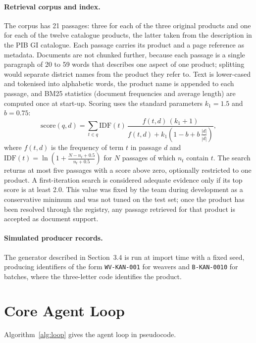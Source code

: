 \paragraph{Retrieval corpus and index.} The corpus has 21 passages: three for each of the three
original products and one for each of the twelve catalogue products, the latter taken from the
description in the PIB GI catalogue. Each passage carries its product and a page reference as metadata.
Documents are not chunked further, because each passage is a single paragraph of 20 to 59 words that
describes one aspect of one product; splitting would separate district names from the product they
refer to. Text is lower-cased and tokenised into alphabetic words, the product name is appended to
each passage, and BM25 statistics (document frequencies and average length) are computed once at
start-up. Scoring uses the standard parameters $k_1 = 1.5$ and $b = 0.75$:
\begin{equation}
\mathrm{score}(q,d) = \sum_{t \in q} \mathrm{IDF}(t)\,\frac{f(t,d)\,(k_1+1)}{f(t,d) + k_1\left(1 - b + b\,\frac{|d|}{\overline{|d|}}\right)},
\end{equation}
where $f(t,d)$ is the frequency of term $t$ in passage $d$ and
$\mathrm{IDF}(t) = \ln\!\left(1 + \frac{N - n_t + 0.5}{n_t + 0.5}\right)$ for $N$ passages of which
$n_t$ contain $t$. The search returns at most five passages with a score above zero, optionally
restricted to one product. A first-iteration search is considered adequate evidence only if its top
score is at least 2.0. This value was fixed by the team during development as a conservative
minimum and was not tuned on the test set; once the product has been resolved through the registry,
any passage retrieved for that product is accepted as document support.

\paragraph{Simulated producer records.} The generator described in Section~3.4 is run at import time with
a fixed seed, producing identifiers of the form \texttt{WV-KAN-001} for weavers and
\texttt{B-KAN-0010} for batches, where the three-letter code identifies the product.

\section{Core Agent Loop}

Algorithm~\ref{alg:loop} gives the agent loop in pseudocode.

